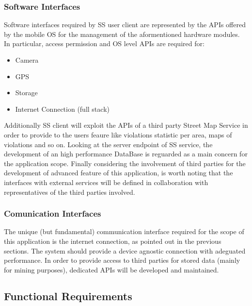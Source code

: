 	\subsubsection{Software Interfaces}
	Software interfaces required by SS user client are represented by the APIs offered by the mobile OS for the management of the aformentioned hardware modules. In particular, access permission and OS level APIs are required for:
	\begin{itemize} 
		\item Camera
		\item GPS
		\item Storage
		\item Internet Connection (full stack)
	\end{itemize}
	Additionally SS client will exploit the APIs of a third party Street Map Service in order to provide to the users feaure like violations statistic per area, maps of violations and so on.\newline
		Looking at the server endpoint of SS service, the development of an high performance DataBase is reguarded as a main concern for the application scope.\newline
	Finally considering the involvement of third parties for the development of advanced feature of this application, is worth noting that the interfaces with external services will be defined in collaboration with representatives of the third parties involved.
	 
	\subsubsection{Comunication Interfaces}
	 The unique (but fundamental) communication interface required for the scope of this application is the internet connection, as pointed out in the previous sections. The system should provide a device agnostic  connection with adeguated performance.\newline
	In order to provide access to  third parties for stored data (mainly for mining purposes), dedicated APIs will be developed and maintained.
	
	\clearpage
	
\subsection{Functional Requirements}
\bigskip


